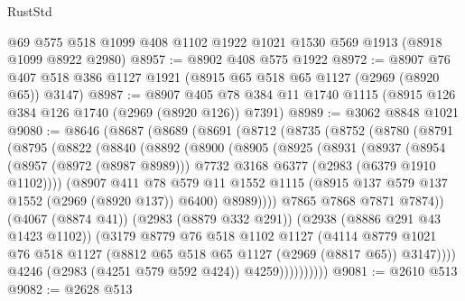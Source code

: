 \begin{lexlean}{RustStd}
\begin{coremodule}
    @69
    @575
    @518
    @1099
    @408
    @1102
    @1922
    @1021
    @1530
    @569
    @1913
    (@8918 @1099 @8922 @2980)
@8957 := @8902 @408 @575 @1922
@8972 := @8907 @76 @407 @518 @386 @1127 @1921 (@8915 @65 @518 @65 @1127 (@2969 (@8920 @65)) @3147)
@8987 := @8907 @405 @78 @384 @11 @1740 @1115 (@8915 @126 @384 @126 @1740 (@2969 (@8920 @126)) @7391)
@8989 := @3062 @8848 @1021
@9080 := @8646
    (@8687
      (@8689
        (@8691
          (@8712
            (@8735
              (@8752
                (@8780
                  (@8791
                    (@8795
                      (@8822
                        (@8840
                          (@8892
                            (@8900
                              (@8905
                                (@8925
                                  (@8931
                                    (@8937
                                      (@8954
                                        (@8957 (@8972 (@8987 @8989)))
                                        @7732
                                        @3168
                                        @6377
                                        (@2983 (@6379 @1910 @1102))))
                                    (@8907
                                      @411
                                      @78
                                      @579
                                      @11
                                      @1552
                                      @1115
                                      (@8915 @137 @579 @137 @1552 (@2969 (@8920 @137)) @6400)
                                      @8989))))
                              @7865
                              @7868
                              @7871
                              @7874))
                          (@4067 (@8874 @41))
                          (@2983 (@8879 @332 @291))
                          (@2938 (@8886 @291 @43 @1423 @1102))
                          (@3179
                            @8779
                            @76
                            @518
                            @1102
                            @1127
                            (@4114
                              @8779
                              @1021
                              @76
                              @518
                              @1127
                              (@8812 @65 @518 @65 @1127 (@2969 (@8817 @65)) @3147))))
                        @4246
                        (@2983 (@4251 @579 @592 @424))
                        @4259))))))))))
@9081 := @2610 @513
@9082 := @2628 @513

\end{coremodule}
\end{lexlean}
